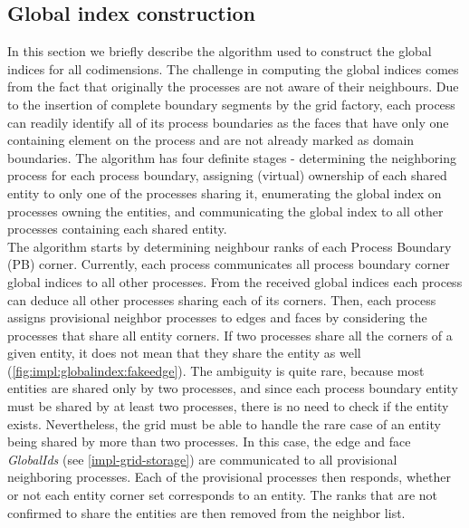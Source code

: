 \subsection{Global index construction}
\label{impl-grid-constructor-globalindex}

\noindent
In this section we briefly describe the algorithm used to construct the global indices for all codimensions. The challenge in computing the global indices comes from the fact that originally the processes are not aware of their neighbours. Due to the insertion of complete boundary segments by the grid factory, each process can readily identify all of its process boundaries as the faces that have only one containing element on the process and are not already marked as domain boundaries. The algorithm has four definite stages - determining the neighboring process for each process boundary, assigning (virtual) ownership of each shared entity to only one of the processes sharing it, enumerating the global index on processes owning the entities, and communicating the global index to all other processes containing each shared entity. \\

\noindent
The algorithm starts by determining neighbour ranks of each Process Boundary (PB) corner. Currently, each process communicates all process boundary corner global indices to all other processes. From the received global indices each process can deduce all other processes sharing each of its corners. Then, each process assigns provisional neighbor processes to edges and faces by considering the processes that share all entity corners. If two processes share all the corners of a given entity, it does not mean that they share the entity as well (\cref{fig:impl:globalindex:fakeedge}). The ambiguity is quite rare, because most entities are shared only by two processes, and since each process boundary entity must be shared by at least two processes, there is no need to check if the entity exists. Nevertheless, the grid must be able to handle the rare case of an entity being shared by more than two processes. In this case, the edge and face \textit{GlobalIds} (see \cref{impl-grid-storage}) are communicated to all provisional neighboring processes. Each of the provisional processes then responds, whether or not each entity corner set corresponds to an entity. The ranks that are not confirmed to share the entities are then removed from the neighbor list. \\

